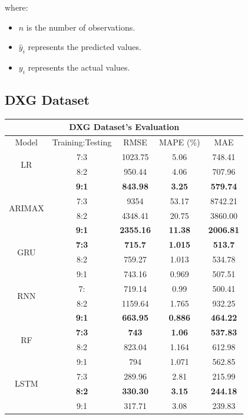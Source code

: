 \documentclass{ieeeojies}
\begin{document}
where:
\begin{itemize}
    \item \(n\) is the number of observations.
    \item \(\hat{y}_i\) represents the predicted values.
    \item \(y_i\) represents the actual values.
\end{itemize}
\subsection{DXG Dataset} 
\begin{table}[H]
  \centering
  \begin{tabular}{|c|c|c|c|c|}
         \hline
         \multicolumn{5}{|c|}{\textbf{DXG Dataset's Evaluation}}\\
         \hline
         \centering Model & Training:Testing & RMSE & MAPE (\%) & MAE\\
         \hline
         \multirow{2}{*}{LR} & 7:3 & 1023.75 & 5.06 & 748.41 \\ & 8:2 & 950.44 & 4.06 & 707.96 \\ & \textbf{9:1} & \textbf{843.98} & \textbf{3.25} & \textbf{579.74}\\
         \hline
         \multirow{2}{*}{ARIMAX} & 7:3&9354& 53.17 &8742.21\\ & 8:2&4348.41&20.75& 3860.00 \\ & \textbf{9:1} & \textbf{2355.16} & \textbf{11.38} & \textbf{2006.81}\\
         \hline
         \multirow{2}{*}{GRU} & \textbf{7:3}& \textbf{715.7} & \textbf{1.015} & \textbf{513.7} \\ & 8:2 & 759.27 & 1.013 & 534.78  \\ & 9:1 & 743.16	&0.969&507.51\\
         \hline
         \multirow{2}{*}{RNN} & 7: &  719.14 &  0.99 &  500.41 \\ & 8:2 &  1159.64 & 1.765 &  932.25 \\ & \textbf{9:1} & \textbf{663.95} & \textbf{0.886} & \textbf{464.22} \\
         \hline
         \multirow{2}{*}{RF} & \textbf{7:3}	& \textbf{743} & \textbf{1.06} &  \textbf{537.83} \\ & 8:2 & 823.04 & 1.164 & 612.98 \\ & 9:1 & 794 & 1.071 & 562.85\\
         \hline
         \multirow{2}{*}{LSTM} & 7:3 & 289.96 & 2.81 & 215.99 \\ & \textbf{8:2} & \textbf{330.30} & \textbf{3.15} & \textbf{244.18} \\ & 9:1 & 317.71	&3.08&239.83\\

\end{tabular}
\end{table}
\end{document}
